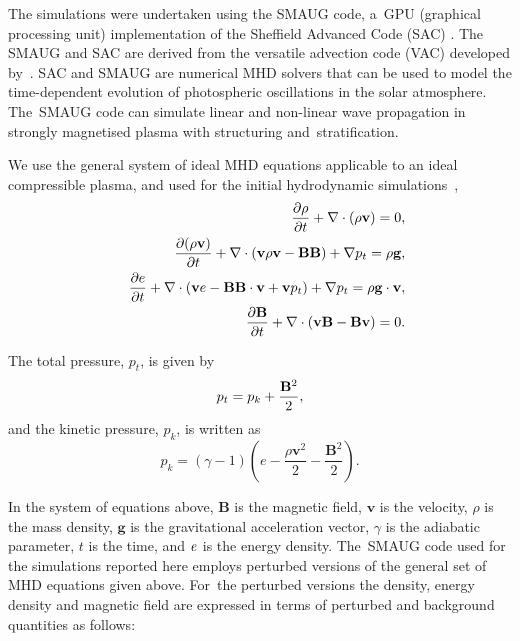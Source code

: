 \documentclass[physics,article,accept,pdftex,moreauthors]{Definitions/mdpi}
\begin{document}
The simulations were undertaken using the SMAUG code, a~GPU {(graphical processing unit)} 
implementation of the Sheffield Advanced Code (SAC) \cite{Shelyag2008}. 
The %
 {SMAUG} %
\cite{Griffiths2015} and SAC  are derived from the versatile advection code (VAC) developed by~\cite{Toth1996}. SAC and SMAUG are numerical MHD solvers  that can be used to model the time-dependent evolution of photospheric oscillations in the solar atmosphere. The~SMAUG code can simulate linear and non-linear wave propagation in strongly magnetised plasma with structuring and~stratification.

We use the 
general system of ideal MHD equations applicable to an ideal compressible plasma, %
 and used for %
 {the} 
initial hydrodynamic {simulations~\cite{Griffiths2018b},} %
\begin{eqnarray}
&& {{\partial \rho}\over{\partial t}}+\nabla\cdot\left( \rho{\mathbf v}\right)=0, \label{e1} \\
&& {{\partial ( \rho {\bf v})}\over{\partial t}}+\nabla\cdot\left( {\bf v}\rho {\bf v}-{\bf B B}\right)+\nabla p_t=\rho{\bf g}, \label{e2}\\
&& \frac{\partial e}{\partial t}+\nabla\cdot\left({\bf v}e-{\bf B B}\cdot{\bf v}+{\bf v}p_{t}\right)+\nabla p_t=\rho{\bf g}\cdot{\bf v}, \label{e3} \\
&& {{\partial{\bf B}}\over{\partial t}} +\nabla \cdot\left(  {\bf vB}-{\bf Bv}\right)=0. \label{e4}
\end{eqnarray}

\noindent
{The } %
total pressure, $p_{t}$, is given by
\begin{equation}
p_{t}=p_{k}+{{\bf B}^{2}\over{2}}, \label{e5}
\end{equation}
and the kinetic pressure, $p_k$, is written as
\begin{equation}
p_{k}=\left(\gamma -1\right)\left(e-\frac{\rho {\mathbf v}^{2}}{2}-\frac{{\mathbf B}^{2}}{2}\right). \label{e6}
\end{equation}

In the system of equations above,  $\mathbf B$ is the magnetic field, $\mathbf v$ is the velocity, $\rho$ is the mass density, $\mathbf g$ 
is the gravitational acceleration vector, $\gamma$ is the adiabatic parameter, $t$ is the time,  %
and  
$\it{e}$ is the energy density. The~SMAUG code used for the simulations reported here employs perturbed versions of the general set of MHD equations given above. For~the perturbed versions the density,  energy density and magnetic field are expressed in terms of perturbed and background quantities as 
{follows:} 
\end{document}
